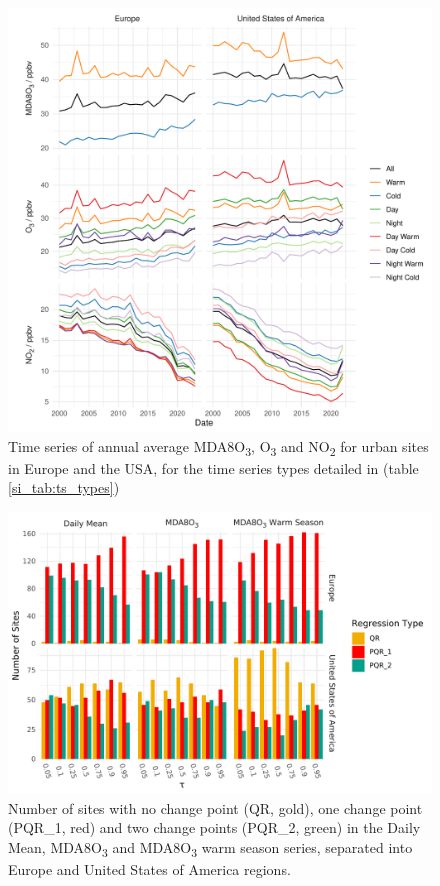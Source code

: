 \documentclass[journal abbreviation, manuscript]{copernicus}
\begin{document}
\begin{figure}[p]
\includegraphics[width=12cm]{figures/paper_figures/f01_overview.pdf}
\caption{Time series of annual average MDA8O\textsubscript{3}, O\textsubscript{3} and NO\textsubscript{2} for urban sites in Europe and the USA, for the time series types detailed in (table \ref{si_tab:ts_types})}
\label{fig:conc_plot}
\end{figure}
\clearpage

\begin{figure}[p]
\includegraphics[width=12cm]{figures/paper_figures/f02_regression_type_bars_o3.pdf}
\caption{Number of sites with no change point (QR, gold), one change point (PQR\_1, red) and two change points (PQR\_2, green) in the Daily Mean, MDA8O\textsubscript{3} and MDA8O\textsubscript{3} warm season series, separated into Europe and United States of America regions.}
\label{fig:regression_type}
\end{figure}
\clearpage
\end{document}
